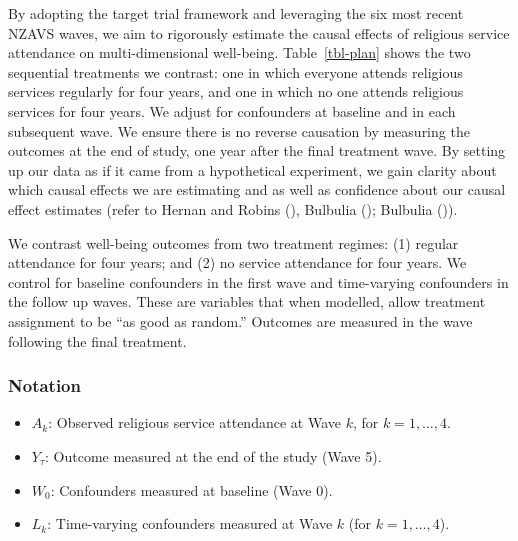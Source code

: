 \documentclass[
  single column]{article}
\providecommand{\tightlist}{%
  \setlength{\itemsep}{0pt}\setlength{\parskip}{0pt}}\usepackage{longtable,booktabs,array}
\begin{document}
By adopting the target trial framework and leveraging the six most
recent NZAVS waves, we aim to rigorously estimate the causal effects of
religious service attendance on multi-dimensional well-being.
Table~\ref{tbl-plan} shows the two sequential treatments we contrast:
one in which everyone attends religious services regularly for four
years, and one in which no one attends religious services for four
years. We adjust for confounders at baseline and in each subsequent
wave. We ensure there is no reverse causation by measuring the outcomes
at the end of study, one year after the final treatment wave. By setting
up our data as if it came from a hypothetical experiment, we gain
clarity about which causal effects we are estimating and as well as
confidence about our causal effect estimates (refer to Hernan and Robins
(), Bulbulia
(); Bulbulia
()).

\begin{table}

\caption{\label{tbl-plan}We contrast well-being outcomes from two
treatment regimes: (1) regular attendance for four years; and (2) no
service attendance for four years. We control for baseline confounders
in the first wave and time-varying confounders in the follow up waves.
These are variables that when modelled, allow treatment assignment to be
``as good as random.'' Outcomes are measured in the wave following the
final treatment.}

\centering{

\vizfive

}

\end{table}%

\subsubsection{Notation}\label{notation}

\begin{itemize}
\tightlist
\item
  \(A_k\): Observed religious service attendance at Wave \(k\), for
  \(k = 1, \dots, 4\).\\
\item
  \(Y_\tau\): Outcome measured at the end of the study (Wave 5).\\
\item
  \(W_0\): Confounders measured at baseline (Wave 0).\\
\item
  \(L_k\): Time-varying confounders measured at Wave \(k\) (for
  \(k = 1, \dots, 4\)).
\end{itemize}
\end{document}
